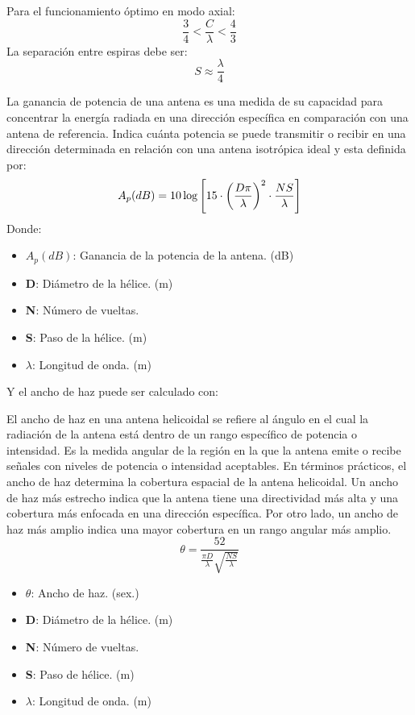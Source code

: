 \documentclass[
	12pt, %
	fleqn, %
	a4paper, %
	oneside, %
]{LegrandOrangeBook}
\begin{document}
\begin{notation}
Para el funcionamiento óptimo en modo axial:
\begin{equation}
\frac{3}{4}<\frac{C}{\lambda}<\frac{4}{3}
\end{equation}
La separación entre espiras debe ser:
\begin{equation}
S\approx\frac{\lambda}{4}
\end{equation}
\end{notation}
\begin{definition}
La ganancia de potencia de una antena es una medida de su capacidad para concentrar la energía radiada en una dirección específica en comparación con una antena de referencia. Indica cuánta potencia se puede transmitir o recibir en una dirección determinada en relación con una antena isotrópica ideal y esta definida por:
\begin{equation}
A_p(dB)=10\log\left[15\cdot \left(\frac{D\pi}{\lambda}\right)^2\cdot\frac{NS}{\lambda}\right]
\end{equation}
Donde:
\begin{itemize}
\item $A_p(dB)$: Ganancia de la potencia de la antena. (dB)
\item \textbf{D}: Diámetro de la hélice. (m)
\item \textbf{N}: Número de vueltas.
\item \textbf{S}: Paso de la hélice. (m)
\item $\lambda$: Longitud de onda. (m)
\end{itemize}
\end{definition}
Y el ancho de haz puede ser calculado con:
\begin{definition}
El ancho de haz en una antena helicoidal se refiere al ángulo en el cual la radiación de la antena está dentro de un rango específico de potencia o intensidad. Es la medida angular de la región en la que la antena emite o recibe señales con niveles de potencia o intensidad aceptables.
En términos prácticos, el ancho de haz determina la cobertura espacial de la antena helicoidal. Un ancho de haz más estrecho indica que la antena tiene una directividad más alta y una cobertura más enfocada en una dirección específica. Por otro lado, un ancho de haz más amplio indica una mayor cobertura en un rango angular más amplio.
\begin{equation}
\theta=\frac{52}{\frac{\pi D}{\lambda}\sqrt{\frac{NS}{\lambda}}}
\end{equation}
\begin{itemize}
\item $\theta$: Ancho de haz. (sex.)
\item \textbf{D}: Diámetro de la hélice. (m)
\item \textbf{N}: Número de vueltas.
\item \textbf{S}: Paso de hélice. (m)
\item $\lambda$: Longitud de onda. (m)
\end{itemize}
\end{definition}
\end{document}
